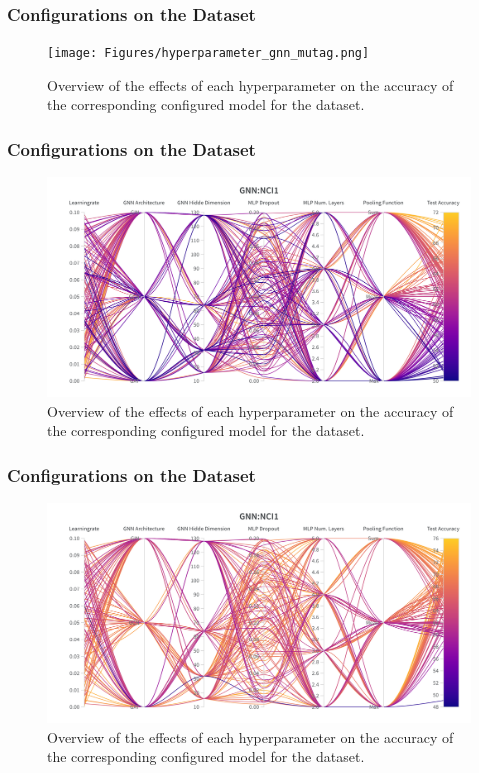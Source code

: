 \subsubsection{\gnn Configurations on the \mutag Dataset}
\begin{figure}[H]
    \centering
    \texttt{[image: Figures/hyperparameter\_gnn\_mutag.png]}
    \caption{Overview of the effects of each hyperparameter on the accuracy of the corresponding configured \gnn model for the \mutag dataset.}
    \label{fig:wandb_gnn_mutag}
\end{figure}

\subsubsection{\gnn Configurations on the \nci Dataset}
\begin{figure}[H]
    \centering
    \includegraphics[width=\textwidth, trim={0 75 0 150}, clip]{Figures/hyperparameter_gnn_nci1.png}
    \caption{Overview of the effects of each hyperparameter on the accuracy of the corresponding configured \gnn model for the \nci dataset.}
    \label{fig:wandb_gnn_nci}
\end{figure}
\clearpage

\subsubsection{\gnn Configurations on the \proteins Dataset}
\begin{figure}[H]
    \centering
    \includegraphics[width=\textwidth, trim={0 75 0 150}, clip]{Figures/hyperparameter_gnn_proteins.png}
    \caption{Overview of the effects of each hyperparameter on the accuracy of the corresponding configured \gnn model for the \proteins dataset.}
    \label{fig:wandb_gnn_proteins}
\end{figure}

